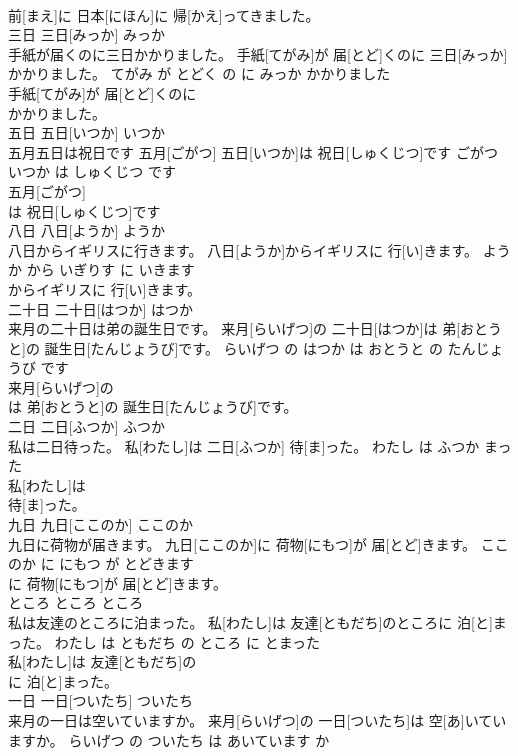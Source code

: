 \documentclass[8pt]{extreport}
\begin{document}
\begin{CJK}{UTF8}{min}
\\	前[まえ]に 日本[にほん]に 帰[かえ]ってきました。			
\\	三日	三日[みっか]	みっか	
\\	手紙が届くのに三日かかりました。	手紙[てがみ]が 届[とど]くのに 三日[みっか]かかりました。	てがみ が とどく の に みっか かかりました	
\\	手紙[てがみ]が 届[とど]くのに
\\	かかりました。			
\\	五日	五日[いつか]	いつか	
\\	五月五日は祝日です	五月[ごがつ] 五日[いつか]は 祝日[しゅくじつ]です	ごがつ いつか は しゅくじつ です	
\\	五月[ごがつ]
\\	は 祝日[しゅくじつ]です			
\\	八日	八日[ようか]	ようか	
\\	八日からイギリスに行きます。	八日[ようか]からイギリスに 行[い]きます。	ようか から いぎりす に いきます	
\\	からイギリスに 行[い]きます。			
\\	二十日	二十日[はつか]	はつか	
\\	来月の二十日は弟の誕生日です。	来月[らいげつ]の 二十日[はつか]は 弟[おとうと]の 誕生日[たんじょうび]です。	らいげつ の はつか は おとうと の たんじょうび です	
\\	来月[らいげつ]の
\\	は 弟[おとうと]の 誕生日[たんじょうび]です。			
\\	二日	二日[ふつか]	ふつか	
\\	私は二日待った。	私[わたし]は 二日[ふつか] 待[ま]った。	わたし は ふつか まった	
\\	私[わたし]は
\\	待[ま]った。			
\\	九日	九日[ここのか]	ここのか	
\\	九日に荷物が届きます。	九日[ここのか]に 荷物[にもつ]が 届[とど]きます。	ここのか に にもつ が とどきます	
\\	に 荷物[にもつ]が 届[とど]きます。			
\\	ところ	ところ	ところ	
\\	私は友達のところに泊まった。	私[わたし]は 友達[ともだち]のところに 泊[と]まった。	わたし は ともだち の ところ に とまった	
\\	私[わたし]は 友達[ともだち]の
\\	に 泊[と]まった。			
\\	一日	一日[ついたち]	ついたち	
\\	来月の一日は空いていますか。	来月[らいげつ]の 一日[ついたち]は 空[あ]いていますか。	らいげつ の ついたち は あいています か	

\end{CJK}
\end{document}

